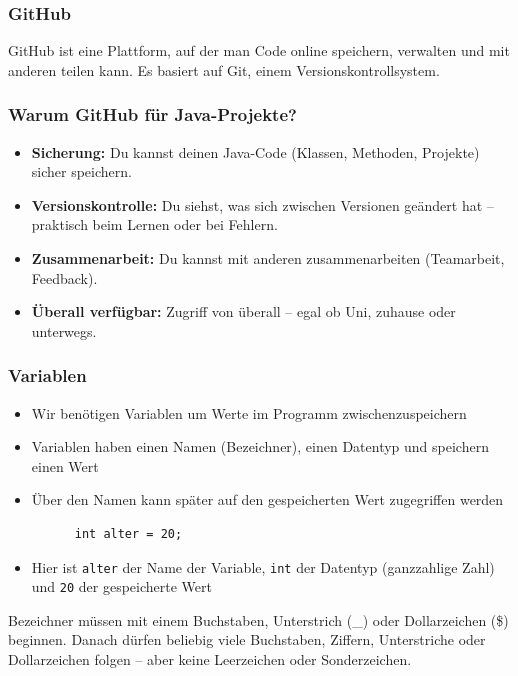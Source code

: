 \documentclass{../../presentation}
\begin{document}
\begin{frame}
  \frametitle{GitHub}
  GitHub ist eine Plattform, auf der man Code online speichern, verwalten und mit anderen teilen kann. Es basiert auf Git, einem Versionskontrollsystem.
\end{frame}

\begin{frame}
  \frametitle{Warum GitHub für Java-Projekte?}
  \begin{itemize}
    \item \textbf{Sicherung:} Du kannst deinen Java-Code (Klassen, Methoden, Projekte) sicher speichern.
    \item \textbf{Versionskontrolle:} Du siehst, was sich zwischen Versionen geändert hat – praktisch beim Lernen oder bei Fehlern.
    \item \textbf{Zusammenarbeit:} Du kannst mit anderen zusammenarbeiten (Teamarbeit, Feedback).
    \item \textbf{Überall verfügbar:} Zugriff von überall – egal ob Uni, zuhause oder unterwegs.
  \end{itemize}
\end{frame}

\begin{frame}[fragile]
  \frametitle{Variablen}
  \begin{itemize}
    \item Wir benötigen Variablen um Werte im Programm zwischenzuspeichern
    \item Variablen haben einen Namen (Bezeichner), einen Datentyp und speichern einen Wert
    \item Über den Namen kann später auf den gespeicherten Wert zugegriffen werden
          \begin{verbatim}
      int alter = 20;
    \end{verbatim}
    \item Hier ist \texttt{alter} der Name der Variable, \texttt{int} der Datentyp (ganzzahlige Zahl) und \texttt{20} der gespeicherte Wert
  \end{itemize}
  \achtung{} Bezeichner müssen mit einem Buchstaben, Unterstrich (\_) oder Dollarzeichen (\$) beginnen.
  Danach dürfen beliebig viele Buchstaben, Ziffern, Unterstriche oder Dollarzeichen folgen -- aber keine Leerzeichen oder Sonderzeichen.
\end{frame}
\end{document}
